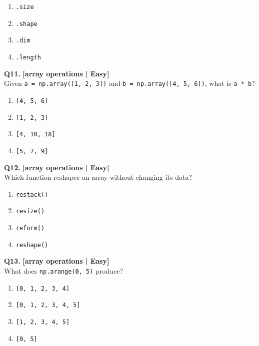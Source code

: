 \begin{enumerate}[label=(\alph*),topsep=2pt,itemsep=1pt,partopsep=0pt,parsep=0pt]
    \item \relax \texttt{.size}
    \item \relax \texttt{.shape}
    \item \relax \texttt{.dim}
    \item \relax \texttt{.length}
\end{enumerate}
\vspace{2mm}

\noindent\textbf{Q11.} \hfill {\small\color{LPUOrange}\textbf{[array operations | Easy]}}\\[2pt]
Given \texttt{a = np.array([1, 2, 3])} and \texttt{b = np.array([4, 5, 6])}, what is \texttt{a * b}?

\begin{enumerate}[label=(\alph*),topsep=2pt,itemsep=1pt,partopsep=0pt,parsep=0pt]
    \item \relax \texttt{[4, 5, 6]}
    \item \relax \texttt{[1, 2, 3]}
    \item \relax \texttt{[4, 10, 18]}
    \item \relax \texttt{[5, 7, 9]}
\end{enumerate}
\vspace{2mm}

\noindent\textbf{Q12.} \hfill {\small\color{LPUOrange}\textbf{[array operations | Easy]}}\\[2pt]
Which function reshapes an array without changing its data?

\begin{enumerate}[label=(\alph*),topsep=2pt,itemsep=1pt,partopsep=0pt,parsep=0pt]
    \item \relax \texttt{restack()}
    \item \relax \texttt{resize()}
    \item \relax \texttt{reform()}
    \item \relax \texttt{reshape()}
\end{enumerate}
\vspace{2mm}

\noindent\textbf{Q13.} \hfill {\small\color{LPUOrange}\textbf{[array operations | Easy]}}\\[2pt]
What does \texttt{np.arange(0, 5)} produce?

\begin{enumerate}[label=(\alph*),topsep=2pt,itemsep=1pt,partopsep=0pt,parsep=0pt]
    \item \relax \texttt{[0, 1, 2, 3, 4]}
    \item \relax \texttt{[0, 1, 2, 3, 4, 5]}
    \item \relax \texttt{[1, 2, 3, 4, 5]}
    \item \relax \texttt{[0, 5]}
\end{enumerate}
\vspace{2mm}

